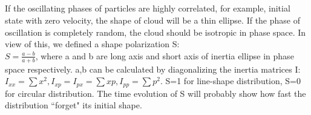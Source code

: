 \documentclass[aps,pre,twocolumn,groupedaddress]{revtex4-1}
\begin{document}
\subsection{{\color{red}{Shape of Distribution in Phase-space}}}

If the oscillating phases of particles are highly correlated, for example, initial state with zero velocity, the shape of cloud will be a thin ellipse. If the phase of oscillation is completely random, the cloud should be isotropic in phase space. In view of this, we defined a shape polarization S:
\\$S=\frac{a-b}{a+b}$, where a and b are long axis and short axis of inertia ellipse in phase space respectively. a,b can be calculated by diagonalizing the inertia matrices I: $I_{xx}=\sum{x^2}, I_{xp}=I_{px}=\sum{xp},I_{pp}=\sum{p^2}$. S=1 for line-shape distribution, S=0 for circular distribution. The time evolution of S will probably show how fast the distribution ``forget" its initial shape.  
\end{document}
